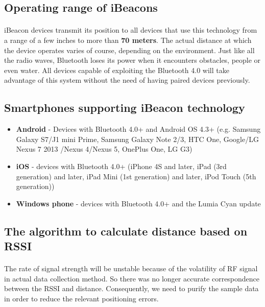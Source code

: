 \documentclass[12pt]{article}
\begin{document}
\subsection{Operating range of iBeacons}
\paragraph{}iBeacon devices transmit its position to all devices that use this technology from a range of a few inches to more than \textbf{70 meters}. The actual distance at which the device operates varies of course, depending on the environment. Just like all the radio waves, Bluetooth loses its power when it encounters obstacles, people or even water. \cite{demo} All devices capable of exploiting the Bluetooth 4.0 will take advantage of this system without the need of having paired devices previously.

\subsection{Smartphones supporting iBeacon technology}
\begin{itemize}
	\item \textbf{Android} - Devices with Bluetooth 4.0+ and Android OS 4.3+ (e.g. Samsung Galaxy S7/J1 mini Prime, Samsung Galaxy Note 2/3, HTC One, Google/LG Nexus 7 2013 /Nexus 4/Nexus 5, OnePlus One, LG G3)
	\item \textbf{iOS} -  devices with Bluetooth 4.0+ (iPhone 4S and later, iPad (3rd generation) and later, iPad Mini (1st generation) and later, iPod Touch (5th generation))
	\item \textbf{Windows phone} - devices with Bluetooth 4.0+ and the Lumia Cyan update

\end{itemize}


\subsection{The algorithm to calculate distance based on RSSI}
\paragraph{}The rate of signal strength will be unstable because of the volatility of RF signal in actual data collection method. So there was no longer accurate correspondence between the RSSI and distance. Consequently, we need to purify the sample data in order to reduce the relevant positioning errors.
\end{document}
